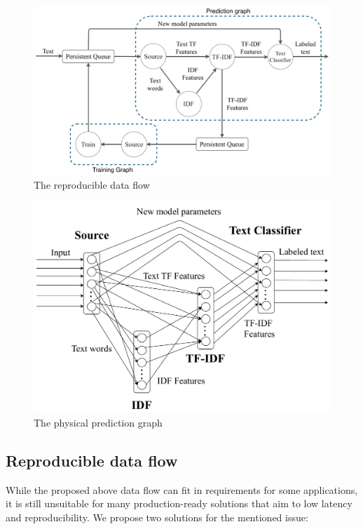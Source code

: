 \begin{figure}[htbp]
  \centering
  \includegraphics[scale=0.300]{pics/pipeline}
  \caption{The reproducible data flow}
  \label {pipeline}
\end{figure}

\begin{figure}[htbp]
  \centering
  \includegraphics[scale=0.375]{pics/physical-graph}
  \caption{The physical prediction graph}
  \label {physical_graph}
\end{figure}

\subsection{Reproducible data flow}

While the proposed above data flow can fit in requirements for some applications, it is still unsuitable for many production-ready solutions that aim to low latency and reproducibility. We propose two solutions for the mentioned issue:

